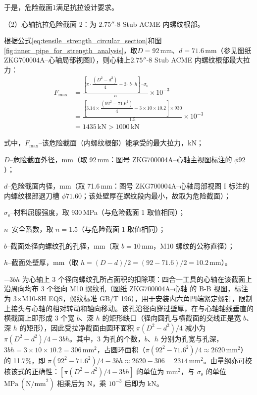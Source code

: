 于是，危险截面1满足抗拉设计要求。

（2）心轴抗拉危险截面 2：为 $2.75''\text{-}8$ Stub ACME 内螺纹根部。

根据公式\ref{eq:tensile_strength_circular_section}和图\ref{fig:inner_pipe_for_strength_analysis}，取$D=92\,\textrm{mm}$、$d=71.6\,\textrm{mm}$（参见图纸ZKG700004A--心轴局部视图I），则心轴上$2.75''\text{-}8$ Stub ACME 内螺纹根部最大拉力：
\begin{equation}
    \begin{aligned}
    F_{\text{max}} &= \frac{\left[\pi \cdot \dfrac{(D^2-d^2)}{4} - 3\cdot b\cdot h\right] \cdot \sigma_{\mathrm{s}}}{n} \times 10^{-3} \\
    &= \frac{\left[3.14 \times \dfrac{(92^2-71.6^2)}{4} - 3 \times 10 \times 10.2\right] \times 930}{1.5} \times 10^{-3} \\
    &= 1435\,\text{kN} > 1000\,\text{kN}
    \end{aligned}
\end{equation}

式中，$F_{\max}$--该危险截面（内螺纹根部）能承受的最大拉力，kN；

$D$--危险截面外径，mm（取 92\,mm：图号 ZKG700004A--心轴主视图标注的 $\phi 92$）；

$d$--危险截面内径，mm（取 71.6\,mm：图号 ZKG700004A--心轴局部视图 I 标注的内螺纹根部退刀槽 $\phi 71.60$；该处壁厚在螺纹段内最小，故取为危险截面）；

$\sigma_{\mathrm{s}}$--材料屈服强度，取 930\,MPa（与危险截面 1 取值相同）；

$n$--安全系数，取 $n = 1.5$（与危险截面 1 取值相同）；

$b$--截面处径向螺纹孔的孔径，mm（取 $b=10$\,mm，M10 螺纹的公称直径）；

$h$--截面处壁厚，mm（取 $h=(D-d)/2=(92-71.6)/2=10.2$\,mm）。

$-3bh$ 为心轴上 3 个径向螺纹孔所占面积的扣除项：四合一工具的心轴在该截面上沿周向均布 3 个径向 M10 螺纹孔（图纸 ZKG700004A--心轴 的 B-B 视图，标注为 3×M10-8H EQS，螺纹标准 GB/T 196），用于安装内六角凹端紧定螺钉，限制上接头与心轴的相对转动和轴向移动。该孔沿径向穿过壁厚，在与心轴轴线垂直的横截面上即形成 3 个宽 $b$、深 $h$ 的矩形缺口（径向圆孔与横截面的交线正是宽 $b$、深 $h$ 的矩形），因此受拉净截面由圆环面积 $\pi (D^2-d^2)/4$ 减小为 $\pi (D^2-d^2)/4-3bh$。其中，$3$ 为孔的个数，$b$、$h$ 分别为孔宽与孔深，$3bh=3\times 10\times 10.2=306\,\textrm{mm}^2$，占圆环面积（$\pi (92^2-71.6^2)/4\approx 2620\,\textrm{mm}^2$）的 11.7\%，即 $\pi (92^2-71.6^2)/4-3bh\approx 2620-306=2314\,\textrm{mm}^2$。由量纲亦可校核该式的正确性：$[\pi (D^2-d^2)/4-3bh]$ 的单位为 $\textrm{mm}^2$，与 $\sigma_{\mathrm{s}}$ 的单位 $\textrm{MPa}\,(\textrm{N/mm}^2)$ 相乘后为 N，乘 $10^{-3}$ 后即为 kN。

